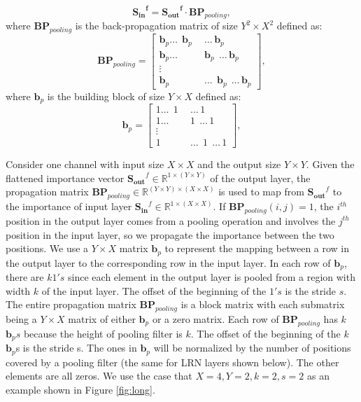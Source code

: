 \documentclass[10pt,twocolumn,letterpaper]{article}
\begin{document}
\begin{equation}
\label{RI_Pooling_Conv}
\mathbf{{S_{in}}^f}=\mathbf{{S_{out}}^f}\cdot \mathbf{BP}_{pooling},
\end{equation}
where $\mathbf{BP}_{pooling}$ is the back-propagation matrix of size $Y^2\times X^2$ defined as:
\begin{equation}
\label{BP_pooling}
\mathbf{BP}_{pooling}=\left[
\begin{aligned}
\mathbf{b}_p \dots\ \ \mathbf{b}_p \ \ &  \dots \,\mathbf{b}_p  \\
\mathbf{b}_p \dots\ \ &\mathbf{b}_p \ \  \dots \,\mathbf{b}_p \\
\vdots \\
\mathbf{b}_p & \dots\ \ \mathbf{b}_p \ \  \dots \,\mathbf{b}_p
\end{aligned}
\right],
\end{equation}
where $\mathbf{b}_p$ is the building block of size $Y \times X$ defined as:
\begin{equation}
\label{b_p}
\mathbf{b}_{p}=\left[
\begin{aligned}
1 \dots\ \ 1 \ \ & \dots \,1  \\
1 \dots\ \ &1 \ \  \dots \,1 \\
\vdots \\
1 & \dots\ \ 1 \ \  \dots \,1
\end{aligned}
\right],
\end{equation}

Consider one channel with input size $X \times X$ and the output size $Y \times Y$.
Given the flattened importance vector $\mathbf{S_{out}}^f \in \mathbb{R}^ {1\times (Y \times Y )}$ of the output layer, the propagation matrix $\mathbf{BP}_{pooling} \in \mathbb{R}^ { (Y \times Y ) \times (X \times X)}$ is used to map from $\mathbf{S_{out}}^f$ to the importance of input layer $\mathbf{S_{in}}^f \in \mathbb{R}^ {1\times (X \times X )}$.
If $\mathbf{BP}_{pooling}(i,j)=1$, the $i^{th}$ position in the output layer comes from a pooling operation and involves the $j^{th}$ position in the input layer, so we propagate the importance between the two positions.
We use a $Y \times X$ matrix $\mathbf{b}_p$ to represent the mapping between a row in the output layer to the corresponding row in the input layer.
In each row of $\mathbf{b}_p$, there are $k$$1's$ since each element in the output layer is pooled from a region with width $k$ of the input layer. 
The offset of the beginning of the $1's$ is the stride $s$. 
The entire propagation matrix $\mathbf{BP}_{pooling}$ is a block matrix with each submatrix being a $Y \times X$ matrix of either $\mathbf{b}_p$ or a zero matrix. 
Each row of $\mathbf{BP}_{pooling}$ has $k$$\mathbf{b}_p s$ because the height of pooling filter is $k$. 
The offset of the beginning of the $k$$\mathbf{b}_p$s is the stride s.
The ones in $\mathbf{b}_p$ will be normalized by the number of positions covered by a pooling filter (the same for LRN layers shown below). 
The other elements are all zeros. 
We use the case that $X=4, Y=2, k=2, s=2$ as an example shown in Figure \ref{fig:long}.
\end{document}
